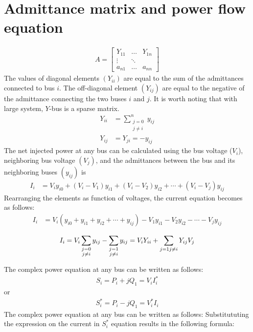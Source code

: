 \documentclass[11pt, oneside, reqno]{amsart}
\numberwithin{equation}{section}
\theoremstyle{plain}%
\theoremstyle{definition}
\theoremstyle{remark}
\begin{document}
\section{Admittance matrix and power flow equation}
\begin{align}
	A = \begin{bmatrix} 
	    Y_{11} & \dots & Y_{1n} \\
	    \vdots & \ddots & \\
	    a_{n1} & \dots & a_{nn} 
	    \end{bmatrix}
\end{align}
The values of diagonal elements $(Y_{ii})$ are equal to the sum of the admittances connected to bus $i$. The off-diagonal element $(Y_{ij})$ are equal to the negative of the admittance connecting the two buses $i$ and $j$. It is worth noting that with large system, $Y$-bus is a sparse matrix.
   \begin{align}
   	Y_{ii}&=\sum^n_{\substack{j=0 \\ j\neq i}}y_{ij}\\
	Y_{ij}&=Y_{ji}=-y_{ij}
   \end{align}
The net injected power at any bus can be calculated using the bus voltage ($V_i$), neighboring bus voltage $(V_j)$, and the admittances between the bus and its neighboring buses $(y_{ij})$ is
\begin{align*}
	I_i &= V_i y_{i0}+(V_i-V_1)y_{i1}
	+(V_i-V_2)y_{i2}+\cdots+(V_i-V_j)y_{ij}
\end{align*}
Rearranging the elements as function of voltages, the current equation becomes as follows:
\begin{align*}
	I_i&=V_i(y_{i0}+y_{i1}+y_{i2}+\cdots+y_{ij})-V_1 y_{i1} - V_2 y_{i2} - \cdots - V_j y_{ij}
\end{align*}


\[
	I_i=V_i\sum_{\substack{j=0 \\ j\neq i}}y_{ij}-\sum_{\substack{j=1 \\ j\neq i}}y_{ij}= V_i Y_{ii}+\sum_{j=1\\ j\neq i}Y_{ij}V_j
\]

The complex power equation at any bus can be written as follows:
\begin{align*}
	S_i=P_i+jQ_1=V_i I^*_i
\end{align*}
or
\begin{align*}
	S^*_i=P_i-jQ_1=V^*_i I_i
\end{align*}
The complex power equation at any bus can be written as follows:
Substitututing the expression on the current in $S^*_i$ equation results in the following formula:
\end{document}
